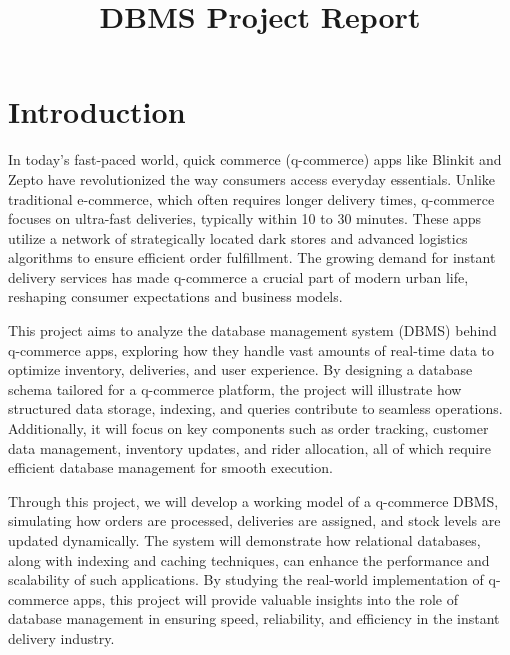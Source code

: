 \documentclass{article}
\begin{document}
\title{\textbf{DBMS Project Report}}
\maketitle
\pagebreak



\tableofcontents
\pagebreak

\section{Introduction}
In today's fast-paced world, quick commerce (q-commerce) apps like Blinkit and Zepto have revolutionized the way consumers access everyday essentials. Unlike traditional e-commerce, which often requires longer delivery times, q-commerce focuses on ultra-fast deliveries, typically within 10 to 30 minutes. These apps utilize a network of strategically located dark stores and advanced logistics algorithms to ensure efficient order fulfillment. The growing demand for instant delivery services has made q-commerce a crucial part of modern urban life, reshaping consumer expectations and business models.\newline

\noindent
This project aims to analyze the database management system (DBMS) behind q-commerce apps, exploring how they handle vast amounts of real-time data to optimize inventory, deliveries, and user experience. By designing a database schema tailored for a q-commerce platform, the project will illustrate how structured data storage, indexing, and queries contribute to seamless operations. Additionally, it will focus on key components such as order tracking, customer data management, inventory updates, and rider allocation, all of which require efficient database management for smooth execution.\newline

\noindent
Through this project, we will develop a working model of a q-commerce DBMS, simulating how orders are processed, deliveries are assigned, and stock levels are updated dynamically. The system will demonstrate how relational databases, along with indexing and caching techniques, can enhance the performance and scalability of such applications. By studying the real-world implementation of q-commerce apps, this project will provide valuable insights into the role of database management in ensuring speed, reliability, and efficiency in the instant delivery industry.
\end{document}
